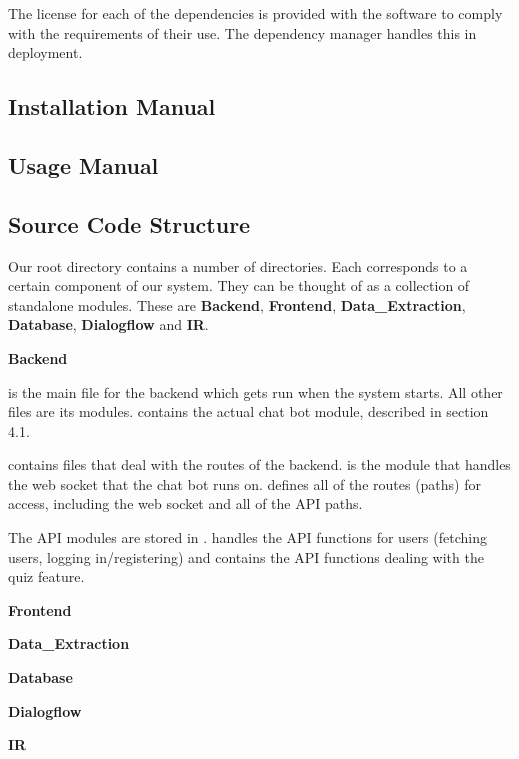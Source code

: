 The license for each of the dependencies is provided with the software to comply with the requirements of their use. The dependency manager  handles this in deployment.

\subsection{Installation Manual}

\subsection{Usage Manual}

\subsection{Source Code Structure}
Our root directory contains a number of directories. Each corresponds to a certain component of our system. They can be thought of as a collection of standalone modules. These are \textbf{Backend}, \textbf{Frontend}, \textbf{Data\_Extraction}, \textbf{Database}, \textbf{Dialogflow} and \textbf{IR}.

\textbf{Backend}

 is the main file for the backend which gets run when the system starts. All other files are its modules.  contains the actual chat bot module, described in section 4.1.

 contains files that deal with the routes of the backend.  is the module that handles the web socket that the chat bot runs on.  defines all of the routes (paths) for access, including the web socket and all of the API paths.

The API modules are stored in .  handles the API functions for users (fetching users, logging in/registering) and  contains the API functions dealing with the quiz feature.

\textbf{Frontend}

\textbf{Data\_Extraction}

\textbf{Database}

\textbf{Dialogflow}

\textbf{IR}
